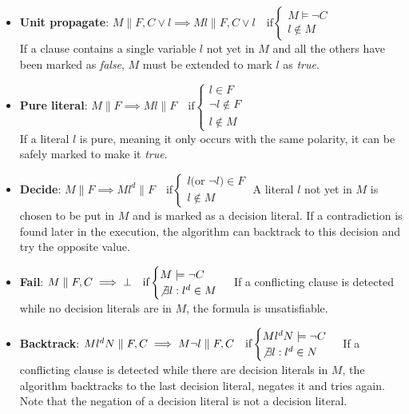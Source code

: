 \begin{itemize}
    \item \textbf{Unit propagate}: $M \parallel F, C \lor l \implies M l \parallel F, C \lor l \quad \text{if} \begin{cases} M \models \neg C \\ l \not \in M \end{cases}$ \\
          If a clause contains a single variable $l$ not yet in $M$ and all the others have been marked as \textit{false}, $M$ must be extended to mark $l$ as \textit{true}.
    \item \textbf{Pure literal}: $M \parallel F \implies M l \parallel F  \quad \text{if} \begin{cases} l \in F \\ \neg l \not \in F \\ l \not \in M \end{cases}$ \\
          If a literal $l$ is pure, meaning it only occurs with the same polarity, it can be safely marked to make it \textit{true}.
    \item \textbf{Decide}: $M \parallel F \implies M l^d \parallel F  \quad \text{if} \begin{cases} l \text{(or } \neg l \text{)} \in F \\ l \not \in M \end{cases}$
          A literal $l$ not yet in $M$ is chosen to be put in $M$ and is marked as a decision literal. If a contradiction is found later in the execution, the algorithm can backtrack to this decision and try the opposite value.
    \item \textbf{Fail}: $M \parallel F, C \implies \bot  \quad \text{if} \begin{cases} M \models \neg C \\ \not \exists l: l^d \in M \end{cases}$
          If a conflicting clause is detected while no decision literals are in $M$, the formula is unsatisfiable.
    \item \textbf{Backtrack}: $M l^d N \parallel F, C \implies M \neg l \parallel F, C  \quad \text{if} \begin{cases} M l^d N \models \neg C \\ \not \exists l: l^d \in N \end{cases}$
          If a conflicting clause is detected while there are decision literals in $M$, the algorithm backtracks to the last decision literal, negates it and tries again. Note that the negation of a decision literal is not a decision literal.
\end{itemize}

